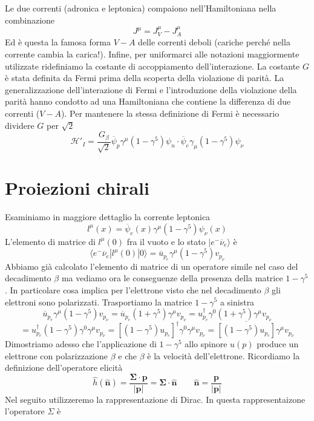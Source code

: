 Le due correnti (adronica e leptonica) compaiono nell'Hamiltoniana nella combinazione
$$
J^\mu = J_V^\mu - J_A^\mu
$$
Ed è questa la famosa forma $V-A$ delle correnti deboli (cariche perché nella corrente cambia la carica!). Infine, per uniformarci alle notazioni maggiormente utilizzate ridefiniamo la costante di accoppiamento dell'interazione. La costante $G$ è stata definita da Fermi prima della scoperta della violazione di parità. La generalizzazione dell'interazione di Fermi e l'introduzione della violazione della parità hanno condotto ad una Hamiltoniana che contiene la differenza di due correnti ($V-A$). Per mantenere la stessa definizione di Fermi è necessario dividere $G$ per $\sqrt{2}$
$$
\mathcal{H}'_I = \frac{G_\beta}{\sqrt{2}} \overline{\psi}_p \gamma^\mu (1 - \gamma^5) \psi_n \cdot \overline{\psi}_e \gamma_\mu (1 - \gamma^5) \psi_\nu
$$
\section{Proiezioni chirali}
Esaminiamo in maggiore dettaglio la corrente leptonica
$$
l^\mu(x) = \overline{\psi}_e(x) \gamma^\mu (1 - \gamma^5) \psi_\nu(x)
$$
L'elemento di matrice di $l^\mu(0)$ fra il vuoto e lo stato $|e^-\overline{\nu}_e\rangle$ è
$$
\langle e^- \overline{\nu}_e | l^\mu(0) | 0 \rangle = \overline{u}_{p_e} \gamma^\mu (1 - \gamma^5) v_{p_\nu}
$$
Abbiamo già calcolato l'elemento di matrice di un operatore simile nel caso del decadimento $\beta$ ma vediamo ora le conseguenze della presenza della matrice $1-\gamma^5$. In particolare cosa implica per l'elettrone visto che nel decadimento $\beta$ gli elettroni sono polarizzati. Trasportiamo la matrice $1-\gamma^5$ a sinistra
$$
\overline{u}_{p_e} \gamma^\mu (1 - \gamma^5) v_{p_\nu} = \overline{u}_{p_e} (1 + \gamma^5) \gamma^\mu v_{p_\nu} = u_{p_e}^\dagger \gamma^0 (1 + \gamma^5) \gamma^\mu v_{p_\nu}
$$
$$
= u_{p_e}^\dagger (1 - \gamma^5) \gamma^0 \gamma^\mu v_{p_\nu} = [(1 - \gamma^5) u_{p_e}]^\dagger \gamma^0 \gamma^\mu v_{p_\nu} = \overline{[(1 - \gamma^5) u_{p_e}]} \gamma^\mu v_{p_\nu}
$$
Dimostriamo adesso che l'applicazione di $1-\gamma^5$ allo spinore $u(p)$ produce un elettrone con polarizzazione $\beta$ e che $\beta$ è la velocità dell'elettrone. Ricordiamo la definizione dell'operatore elicità
$$
\hat{h}(\hat{\mathbf{n}}) = \frac{\boldsymbol{\Sigma} \cdot \mathbf{p}}{|\mathbf{p}|} = \boldsymbol{\Sigma} \cdot \hat{\mathbf{n}} \qquad \hat{\mathbf{n}} = \frac{\mathbf{p}}{|\mathbf{p}|}
$$
Nel seguito utilizzeremo la rappresentazione di Dirac. In questa rappresentaizone l'operatore $\Sigma$ è
